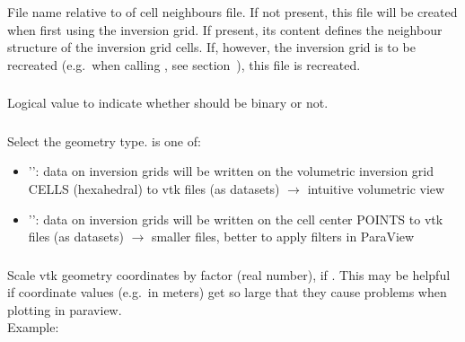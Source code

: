 \subsubsection{}
File name relative to  of cell neighbours file. If not
present, this file will be created when first using the inversion grid. If present, its content defines 
the neighbour structure of the inversion grid cells. If, however, the inversion grid
is to be recreated (e.g.\ when calling , see section~),
this file is recreated.
\subsubsection{}
Logical value to indicate whether  should be binary or not.
\subsubsection{}
Select the geometry type.  is one of:
\begin{itemize}
\item[]'': data on inversion grids will be written on the volumetric inversion grid CELLS (hexahedral) to vtk files (as  datasets) $\rightarrow$ intuitive volumetric view
\item[]'': data on inversion grids will be written on the cell center POINTS to vtk files (as  datasets) $\rightarrow$ smaller files, better to apply filters in ParaView
\end{itemize}
\subsubsection{}
Scale vtk geometry coordinates by factor  (real number), if 
. This may be helpful if coordinate values (e.g.\ in meters) 
get so large that they cause problems when plotting in paraview.\\
Example:\\
\\
%
